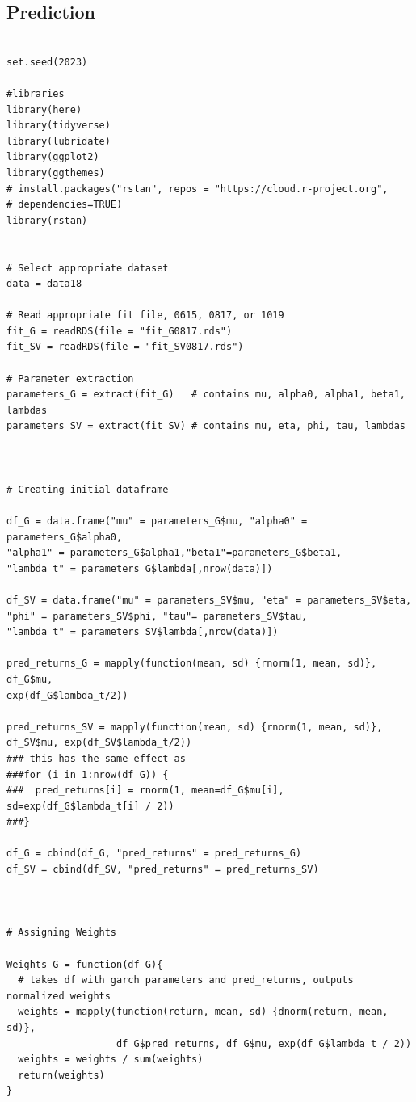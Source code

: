 \documentclass[12pt,letterpaper,reqno,fleqn]{article}
\begin{document}
\subsection{Prediction}
\begin{verbatim}

set.seed(2023)

#libraries
library(here)
library(tidyverse)
library(lubridate)
library(ggplot2)
library(ggthemes)
# install.packages("rstan", repos = "https://cloud.r-project.org", 
# dependencies=TRUE)
library(rstan)


# Select appropriate dataset
data = data18

# Read appropriate fit file, 0615, 0817, or 1019
fit_G = readRDS(file = "fit_G0817.rds")
fit_SV = readRDS(file = "fit_SV0817.rds")

# Parameter extraction
parameters_G = extract(fit_G)   # contains mu, alpha0, alpha1, beta1, lambdas
parameters_SV = extract(fit_SV) # contains mu, eta, phi, tau, lambdas



# Creating initial dataframe

df_G = data.frame("mu" = parameters_G$mu, "alpha0" = parameters_G$alpha0,
"alpha1" = parameters_G$alpha1,"beta1"=parameters_G$beta1, 
"lambda_t" = parameters_G$lambda[,nrow(data)])

df_SV = data.frame("mu" = parameters_SV$mu, "eta" = parameters_SV$eta,
"phi" = parameters_SV$phi, "tau"= parameters_SV$tau, 
"lambda_t" = parameters_SV$lambda[,nrow(data)])

pred_returns_G = mapply(function(mean, sd) {rnorm(1, mean, sd)}, df_G$mu,
exp(df_G$lambda_t/2))

pred_returns_SV = mapply(function(mean, sd) {rnorm(1, mean, sd)},
df_SV$mu, exp(df_SV$lambda_t/2))
### this has the same effect as
###for (i in 1:nrow(df_G)) {
###  pred_returns[i] = rnorm(1, mean=df_G$mu[i], sd=exp(df_G$lambda_t[i] / 2))
###}

df_G = cbind(df_G, "pred_returns" = pred_returns_G)
df_SV = cbind(df_SV, "pred_returns" = pred_returns_SV)



# Assigning Weights

Weights_G = function(df_G){
  # takes df with garch parameters and pred_returns, outputs normalized weights
  weights = mapply(function(return, mean, sd) {dnorm(return, mean, sd)}, 
                   df_G$pred_returns, df_G$mu, exp(df_G$lambda_t / 2))
  weights = weights / sum(weights)
  return(weights)
}


\end{verbatim}
\end{document}
